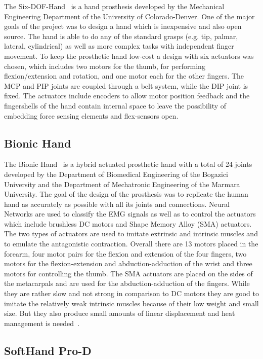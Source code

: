 \documentclass[a4paper, 10pt, conference]{ieeeconf}      %
\begin{document}
The Six-DOF-Hand~\cite{6dofhand} is a hand prosthesis developed by the Mechanical Engineering Department of the University of Colorado-Denver. One of the major goals of the project was to design a hand which is inexpensive and also open source. The hand is able to do any of the standard grasps (e.g. tip, palmar, lateral, cylindrical) as well as more complex tasks with independent finger movement. To keep the prosthetic hand low-cost a design with six actuators was chosen, which includes two motors for the thumb, for performing flexion/extension and rotation, and one motor each for the other fingers. The MCP and PIP joints are coupled through a belt system, while the DIP joint is fixed. The actuators include encoders to allow motor position feedback and the fingershells of the hand contain internal space to leave the possibility of embedding force sensing elements and flex-sensors open.

\subsection{Bionic Hand}

The Bionic Hand~\cite{bionichand} is a hybrid actuated prosthetic hand with a total of 24 joints developed by the Department of Biomedical Engineering of the Bogazici University and the Department of Mechatronic Engineering of the Marmara University. The goal of the design of the prosthesis was to replicate the human hand as accurately as possible with all its joints and connections. Neural Networks are used to classify the EMG signals as well as to control the actuators which include brushless DC motors and Shape Memory Alloy (SMA) actuators. The two types of actuators are used to imitate extrinsic and intrinsic muscles and to emulate the antagonistic contraction. Overall there are 13 motors placed in the forearm, four motor pairs for the flexion and extension of the four fingers, two motors for the flexion-extension and abduction-adduction of the wrist and three motors for controlling the thumb. The SMA actuators are placed on the sides of the metacarpals and are used for the abduction-adduction of the fingers. While they are rather slow and not strong in comparison to DC motors they are good to imitate the relatively weak intrinsic muscles because of their low weight and small size. But they also produce small amounts of linear displacement and heat management is needed~\cite{bundhoo}.


\subsection{SoftHand Pro-D}
\end{document}
